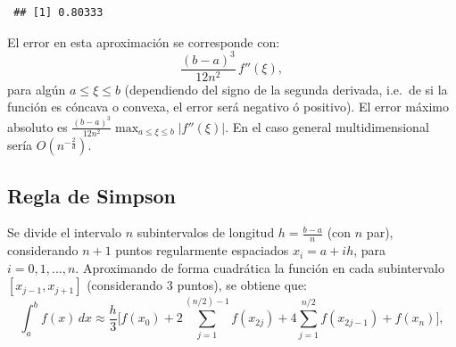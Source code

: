 \documentclass[
  spanish,
  10pt,
]{book}
\theoremstyle{break}
\theoremstyle{nonumberplain}
\begin{document}
\begin{verbatim}
 ## [1] 0.80333
\end{verbatim}

El error en esta aproximación se corresponde con:
\[ \frac{(b-a)^3}{12n^2}\,f''(\xi), \]
para algún \(a\leq \xi \leq b\) (dependiendo del signo de la segunda derivada,
i.e.~de si la función es cóncava o convexa, el error será negativo ó positivo). El error
máximo absoluto es \(\frac{(b-a)^3}{12n^2}\max_{a\leq \xi \leq b}\left|f''(\xi)\right|\).
En el caso general multidimensional sería \(O(n^{-\frac{2}{d}})\).

\subsection{Regla de Simpson}\label{regla-de-simpson}

Se divide el intervalo \(n\) subintervalos de longitud \(h= \frac{b-a}{n}\) (con \(n\) par),
considerando \(n + 1\) puntos regularmente espaciados \(x_i = a + ih\), para \(i = 0, 1, ..., n\).
Aproximando de forma cuadrática la función en cada subintervalo \([x_{j-1},x_{j+1}]\)
(considerando 3 puntos), se obtiene que:
\[ \int_a^b f(x) \, dx \approx \frac{h}{3} \bigg[ 
f(x_0)+2\sum_{j=1}^{(n/2)-1}f(x_{2j})+ 4\sum_{j=1}^{n/2}f(x_{2j-1})+f(x_n) \bigg],\]
\end{document}

